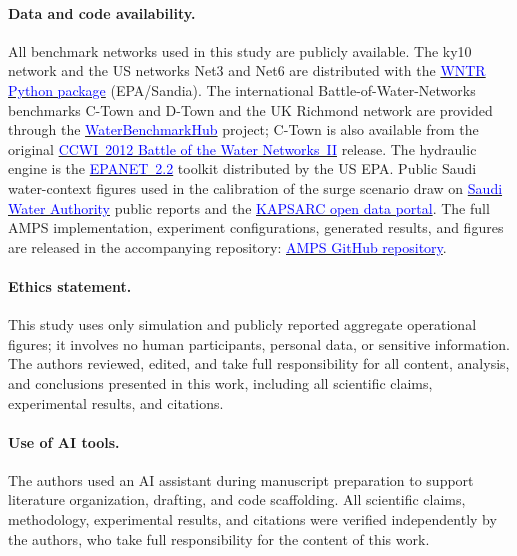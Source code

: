 \documentclass[11pt,a4paper]{article}
\begin{document}
\paragraph{Data and code availability.}
All benchmark networks used in this study are publicly available. The ky10
network and the US networks Net3 and Net6 are distributed with the
\href{https://github.com/USEPA/WNTR}{\textcolor{blue}{WNTR Python package}}
(EPA/Sandia). The international Battle-of-Water-Networks benchmarks C-Town and
D-Town and the UK Richmond network are provided through the
\href{https://github.com/WaterFutures/water-benchmark-hub}{\textcolor{blue}{WaterBenchmarkHub}}
project; C-Town is also available from the original
\href{https://www.exeter.ac.uk/research/cws/downloads/benchmarks/}{\textcolor{blue}{CCWI~2012 Battle of the Water Networks~II}}
release. The hydraulic engine is the
\href{https://www.epa.gov/water-research/epanet}{\textcolor{blue}{EPANET~2.2}}
toolkit distributed by the US EPA. Public Saudi water-context figures used in
the calibration of the surge scenario draw on
\href{https://swa.gov.sa/en}{\textcolor{blue}{Saudi Water Authority}} public
reports and the
\href{https://datasource.kapsarc.org/}{\textcolor{blue}{KAPSARC open data portal}}.
The full AMPS implementation, experiment configurations, generated results, and
figures are released in the accompanying repository:
\href{https://github.com/drhamzahfaraj/AMPS-An-Anticipatory-Multi-Agent-Framework-for-Pump-Scheduling-under-Predictable-Demand-Surges}{\textcolor{blue}{AMPS GitHub repository}}.

\paragraph{Ethics statement.}
This study uses only simulation and publicly reported aggregate operational
figures; it involves no human participants, personal data, or sensitive
information. The authors reviewed, edited, and take full responsibility for all
content, analysis, and conclusions presented in this work, including all
scientific claims, experimental results, and citations.

\paragraph{Use of AI tools.}
The authors used an AI assistant during manuscript preparation to support
literature organization, drafting, and code scaffolding. All scientific claims,
methodology, experimental results, and citations were verified independently by
the authors, who take full responsibility for the content of this work.
\end{document}
